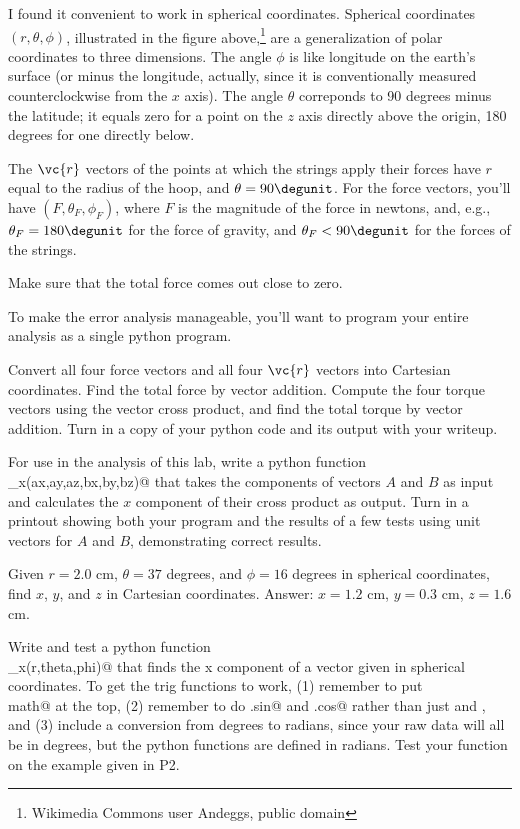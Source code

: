 \pagebreak


I found it convenient to work in spherical coordinates. Spherical coordinates $(r,\theta,\phi)$, illustrated in the figure above,\footnote{Wikimedia Commons user Andeggs, public domain} %
are a generalization of polar coordinates to three dimensions. The angle $\phi$ is like longitude on the earth's surface
(or minus the longitude, actually, since it is conventionally measured counterclockwise from the $x$ axis).
The angle $\theta$ correponds to 90 degrees minus the latitude; it equals zero for a point on the $z$ axis directly above the origin, 180 degrees
for one directly below.

The $\vc{r}$ vectors of the points
at which the strings apply their forces have $r$ equal to the radius of the hoop, and $\theta=90 \degunit$. For the force vectors,
you'll have $(F,\theta_F,\phi_F)$, where $F$ is the magnitude of the force in newtons, and, e.g., $\theta_F=180\degunit$ for the
force of gravity, and $\theta_F<90\degunit$ for the forces of the strings.

\selfcheck

Make sure that the total force comes out close to zero.

\analysis

To make the error analysis manageable, you'll want to program your entire analysis as a single python program.

Convert all four force vectors and all four $\vc{r}$ vectors into Cartesian coordinates. Find the total force by vector addition.
Compute the four torque vectors using the vector cross product, and find the total torque by vector addition.
Turn in a copy of your python code and its output with your writeup. 

\prelab

\prelabquestion For use in the analysis of this lab, write a python function \verb@cross_x(ax,ay,az,bx,by,bz)@ that
takes the components of vectors $A$ and $B$ as input and calculates the $x$ component of their cross product as output.
Turn in a printout showing both your program and the results of a few tests using unit vectors for $A$ and $B$,
demonstrating correct results.

\prelabquestion Given $r=2.0$ cm, $\theta=37$ degrees, and $\phi=16$ degrees in spherical coordinates, find $x$, $y$, and $z$
in Cartesian coordinates. Answer: $x=1.2$ cm, $y=0.3$ cm, $z=1.6$ cm.

\prelabquestion Write and test a python function \\
\verb@cart_x(r,theta,phi)@
that finds the x component of a vector given in spherical coordinates.
To get the trig functions to work, (1) remember to put\\
 \verb@import math@ at the top, (2) remember to do \verb@math.sin@
and \verb@math.cos@ rather than just \verb@sin@ and \verb@cos@, and (3) include a conversion from degrees to radians, since
your raw data will all be in degrees, but the python functions are defined in radians. Test your function on the example
given in P2.
